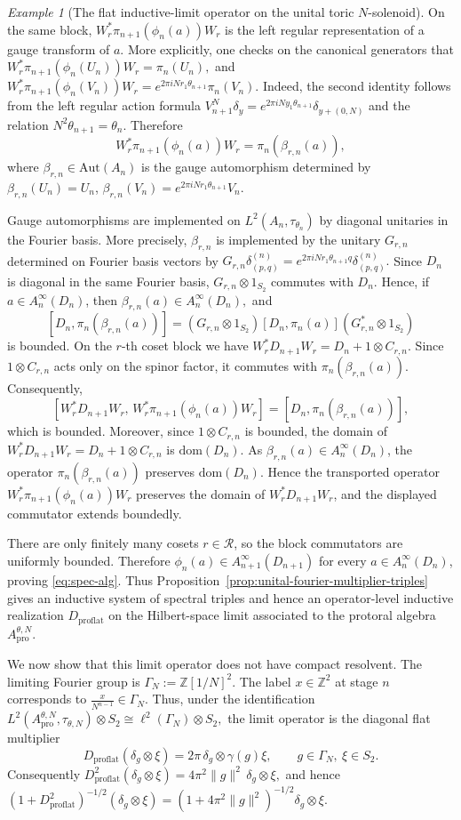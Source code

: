 \documentclass[11pt]{amsart}
\theoremstyle{definition}
\theoremstyle{remark}
\newtheorem{example}[theorem]{Example}
\newcommand{\Z}{\mathbb{Z}}
\newcommand{\Aut}{\mathrm{Aut}}
\newcommand{\ex}{\mathrm{pro}}
\newcommand{\dom}{\mathrm{dom}}
\begin{document}
\begin{example}[The flat inductive-limit operator on the unital toric $N$-solenoid]
On the same block, $W_r^*\pi_{n+1}(\phi_n(a))W_r$ is the left regular
representation of a gauge transform of $a$. More explicitly, one checks on
the canonical generators that $W_r^*\pi_{n+1}(\phi_n(U_n))W_r=\pi_n(U_n),$
and $W_r^*\pi_{n+1}(\phi_n(V_n))W_r=e^{2\pi iN r_1\theta_{n+1}}\pi_n(V_n).$
Indeed, the second identity follows from the left regular action formula $V_{n+1}^N\delta_y=e^{2\pi iN y_1\theta_{n+1}}\delta_{y+(0,N)}$
and the relation $N^2\theta_{n+1}=\theta_n$. Therefore
\[
W_r^*\pi_{n+1}(\phi_n(a))W_r
=
\pi_n(\beta_{r,n}(a)),
\]
where $\beta_{r,n}\in\Aut(A_n)$ is the gauge automorphism determined by $\beta_{r,n}(U_n)=U_n$, $\beta_{r,n}(V_n)=e^{2\pi iN r_1\theta_{n+1}}V_n.$

Gauge automorphisms are implemented on $L^2(A_n,\tau_{\theta_n})$ by diagonal
unitaries in the Fourier basis. More precisely, $\beta_{r,n}$ is implemented by the unitary $G_{r,n}$ determined on
Fourier basis vectors by $G_{r,n}\delta_{(p,q)}^{(n)}=e^{2\pi iN r_1\theta_{n+1}q}\delta_{(p,q)}^{(n)}.$
Since $D_n$ is diagonal in the same Fourier basis, $G_{r,n}\otimes 1_{S_2}$
commutes with $D_n$. Hence, if $a\in A_n^\infty(D_n)$, then $\beta_{r,n}(a)\in A_n^\infty(D_n),$
and
\[
[D_n,\pi_n(\beta_{r,n}(a))]
=
(G_{r,n}\otimes 1_{S_2})
[D_n,\pi_n(a)]
(G_{r,n}^*\otimes 1_{S_2})
\]
is bounded. On the $r$-th coset block we have $W_r^*D_{n+1}W_r=D_n+1\otimes C_{r,n}.$ Since $1\otimes C_{r,n}$ acts only on the spinor factor, it commutes with
$\pi_n(\beta_{r,n}(a))$. Consequently,
\[
[
W_r^*D_{n+1}W_r,\,
W_r^*\pi_{n+1}(\phi_n(a))W_r
]
=
[D_n,\pi_n(\beta_{r,n}(a))],
\]
which is bounded. Moreover, since $1\otimes C_{r,n}$ is bounded, the domain of
$W_r^*D_{n+1}W_r=D_n+1\otimes C_{r,n}$ is $\dom(D_n)$. As
$\beta_{r,n}(a)\in A_n^\infty(D_n)$, the operator
$\pi_n(\beta_{r,n}(a))$ preserves $\dom(D_n)$. Hence the transported
operator $W_r^*\pi_{n+1}(\phi_n(a))W_r$ preserves the domain of
$W_r^*D_{n+1}W_r$, and the displayed commutator extends boundedly.

There are only finitely many cosets $r\in\mathcal R$, so the block
commutators are uniformly bounded. Therefore $\phi_n(a)\in A_{n+1}^\infty(D_{n+1})$
for every $a\in A_n^\infty(D_n)$, proving \eqref{eq:spec-alg}. Thus Proposition~\ref{prop:unital-fourier-multiplier-triples} gives an
inductive system of spectral triples and hence an operator-level inductive
realization $D_{\mathrm{proflat}}$ on the Hilbert-space limit associated to the protoral algebra
$A_{\ex}^{\theta,N}$.

We now show that this limit operator does not have compact resolvent. The
limiting Fourier group is $\Gamma_N:=\Z[1/N]^2.$
The label $x\in\Z^2$ at stage $n$ corresponds to $\frac{x}{N^{n-1}}\in\Gamma_N.$
Thus, under the identification $L^2(A_{\ex}^{\theta,N},\tau_{\theta,N})\otimes S_2
\cong
\ell^2(\Gamma_N)\otimes S_2,$
the limit operator is the diagonal flat multiplier
\[
D_{\mathrm{proflat}}(\delta_g\otimes\xi)
=
2\pi\,\delta_g\otimes\gamma(g)\xi,
\qquad
g\in\Gamma_N,\ \xi\in S_2.
\]
Consequently $D_{\mathrm{proflat}}^2(\delta_g\otimes\xi)=4\pi^2\|g\|^2\,\delta_g\otimes\xi,$
and hence $(1+D_{\mathrm{proflat}}^2)^{-1/2}(\delta_g\otimes\xi)=(1+4\pi^2\|g\|^2)^{-1/2}\delta_g\otimes\xi.$


\end{example}
\end{document}
